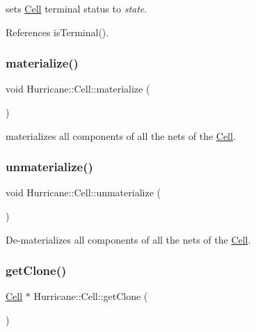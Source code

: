 sets \mbox{\hyperlink{classHurricane_1_1Cell}{Cell}} terminal status to {\itshape state}. 

References is\+Terminal().

\mbox{\label{classHurricane_1_1Cell_affefc597317063857f4904d4b16d5d4f}} 
\subsubsection{\texorpdfstring{materialize()}{materialize()}}
{\footnotesize\ttfamily void Hurricane\+::\+Cell\+::materialize (\begin{DoxyParamCaption}{ }\end{DoxyParamCaption})}

materializes all components of all the nets of the \mbox{\hyperlink{classHurricane_1_1Cell}{Cell}}. \mbox{\label{classHurricane_1_1Cell_a40c9ba4e3fc76b0c4bc58af8dcaddf53}} 
\subsubsection{\texorpdfstring{unmaterialize()}{unmaterialize()}}
{\footnotesize\ttfamily void Hurricane\+::\+Cell\+::unmaterialize (\begin{DoxyParamCaption}{ }\end{DoxyParamCaption})}

De-\/materializes all components of all the nets of the \mbox{\hyperlink{classHurricane_1_1Cell}{Cell}}. \mbox{\label{classHurricane_1_1Cell_a092f53c7f517ecc70d9ba375296c5d5b}} 
\subsubsection{\texorpdfstring{get\+Clone()}{getClone()}}
{\footnotesize\ttfamily \mbox{\hyperlink{classHurricane_1_1Cell}{Cell}} $\ast$ Hurricane\+::\+Cell\+::get\+Clone (\begin{DoxyParamCaption}{ }\end{DoxyParamCaption})}

